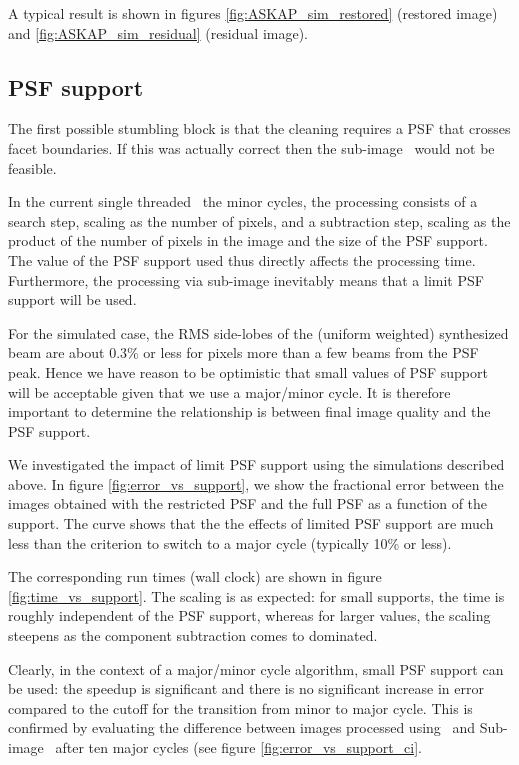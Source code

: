 \documentclass[11pt,a4paper,variablewidth]{article}
\begin{document}
A typical result is shown in figures \ref{fig:ASKAP_sim_restored} (restored image) and \ref{fig:ASKAP_sim_residual} (residual image).

\subsection{PSF support}

The first possible stumbling block is that the cleaning requires a PSF that crosses facet boundaries. If this was actually correct then the sub-image \MAM\ would not be feasible.

In the current single threaded \MAM\ the minor cycles, the processing consists of a search step, scaling as the number of pixels, and a subtraction step,  scaling as the product of the number of pixels in the image and the size of the PSF support. The value of the PSF support used thus directly affects the processing time. Furthermore, the processing via sub-image inevitably means that a limit PSF support will be used.

For the simulated case, the RMS side-lobes of the (uniform weighted) synthesized beam are about 0.3\% or less for pixels more than a few beams from the PSF peak. Hence we have reason to be optimistic that small values of PSF support will be acceptable given that we use a major/minor cycle. It is therefore important to determine the relationship is between final image quality and the PSF support. 

We investigated the impact of limit PSF support using the simulations described above. In figure \ref{fig:error_vs_support}, we show the fractional error between the images obtained with the restricted PSF and the full PSF as a function of the support. The curve shows that the the effects of limited PSF support are much less than the criterion to switch to a major cycle (typically 10\% or less).

The corresponding run times (wall clock) are shown in figure \ref{fig:time_vs_support}. The scaling is as expected: for small supports, the time is roughly independent of the PSF support, whereas for larger values, the scaling steepens as the component subtraction comes to dominated.

Clearly, in the context of a major/minor cycle algorithm, small PSF support can be used: the speedup is significant and there is no significant increase in error compared to the cutoff for the transition from minor to major cycle. This is confirmed by evaluating the difference between images processed using \MAM\ and Sub-image \MAM\ after ten major cycles (see figure \ref{fig:error_vs_support_ci}.
\end{document}
